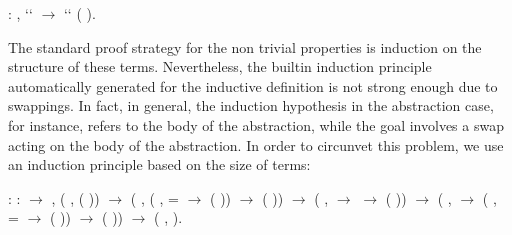 \begin{coqdoccode}
\coqdocemptyline
\coqdocnoindent
{}  : \coqdockw{\ensuremath{\forall}}   ,  ``   \ensuremath{\rightarrow}  ``  (   ).\coqdoceol
\coqdocemptyline
\coqdocemptyline
\end{coqdoccode}
The standard proof strategy for the non trivial properties is induction on the structure of these terms. Nevertheless, the builtin induction principle automatically generated for the inductive definition  is not strong enough due to swappings. In fact, in general, the induction hypothesis in the abstraction case, for instance, refers to the body of the abstraction, while the goal involves a swap acting on the body of the abstraction. In order to circunvet this problem, we use an induction principle based on the size of terms: 
\begin{coqdoccode}
\coqdocemptyline
\coqdocnoindent
{} : \coqdockw{\ensuremath{\forall}}  :  \ensuremath{\rightarrow} , (\coqdockw{\ensuremath{\forall}} ,  ( )) \ensuremath{\rightarrow}\coqdoceol
\coqdocindent{0.50em}
(\coqdockw{\ensuremath{\forall}}  , (\coqdockw{\ensuremath{\forall}}   ,   =   \ensuremath{\rightarrow}  (   )) \ensuremath{\rightarrow}  (  )) \ensuremath{\rightarrow}\coqdoceol
\coqdocindent{0.50em}
(\coqdockw{\ensuremath{\forall}}  ,   \ensuremath{\rightarrow}   \ensuremath{\rightarrow}  (  )) \ensuremath{\rightarrow}\coqdoceol
\coqdocindent{0.50em}
(\coqdockw{\ensuremath{\forall}}   ,   \ensuremath{\rightarrow} (\coqdockw{\ensuremath{\forall}}   ,   =   \ensuremath{\rightarrow}  (   )) \ensuremath{\rightarrow}  (   )) \ensuremath{\rightarrow} (\coqdockw{\ensuremath{\forall}} ,  ).\coqdoceol
\coqdocemptyline
\end{coqdoccode}
